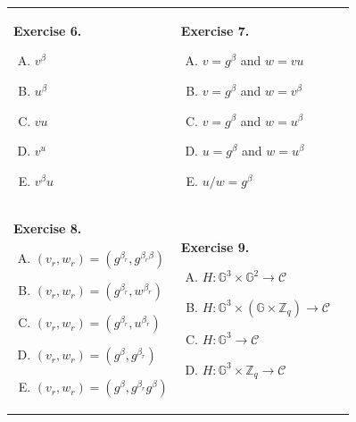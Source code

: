 \documentclass{zkdl-tests-template}
\begin{document}
\begin{tcolorbox}[colback=gray!10!white,fonttitle=\bfseries,colframe=purple!80!black,title=Exercises 6-10. Non-Interactive Chaum-Pedersen Protocol.]
    \begin{center}
        \begin{tabular}{p{5cm}p{5.15cm}p{6cm}}
            \textbf{Exercise 6.}
            \begin{enumerate}[A)]
                \item $v^{\beta}$
                \item $u^{\beta}$
                \item $vu$
                \item $v^u$
                \item $v^{\beta}u$
            \end{enumerate} &   
            \textbf{Exercise 7.}
            \begin{enumerate}[A)]
                \item $v = g^{\beta}$ and $w = vu$
                \item $v = g^{\beta}$ and $w = v^{\beta}$
                \item $v = g^{\beta}$ and $w = u^{\beta}$
                \item $u = g^{\beta}$ and $w = u^{\beta}$
                \item $u/w = g^{\beta}$
            \end{enumerate} & \\
            \textbf{Exercise 8.}
            \begin{enumerate}[A)]
                \item $(v_r,w_r) = (g^{\beta_r},g^{\beta_r\beta})$
                \item $(v_r,w_r) = (g^{\beta_r},w^{\beta_r})$
                \item $(v_r,w_r) = (g^{\beta_r},u^{\beta_r})$
                \item $(v_r,w_r) = (g^{\beta},g^{\beta_r})$
                \item $(v_r,w_r) = (g^{\beta},g^{\beta_r}g^{\beta})$
            \end{enumerate}
            &
            \textbf{Exercise 9.}
            \begin{enumerate}[A)]
                \item $H: \mathbb{G}^3 \times \mathbb{G}^2 \to \mathcal{C}$
                \item $H: \mathbb{G}^3 \times (\mathbb{G} \times \mathbb{Z}_q) \to \mathcal{C}$
                \item $H: \mathbb{G}^3 \to \mathcal{C}$
                \item $H: \mathbb{G}^3 \times \mathbb{Z}_q \to \mathcal{C}$

\end{enumerate}
\end{tabular}
\end{center}
\end{tcolorbox}
\end{document}
